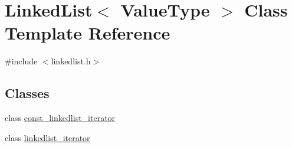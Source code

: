 \hypertarget{classLinkedList}{}\section{Linked\+List$<$ Value\+Type $>$ Class Template Reference}
\label{classLinkedList}


{\ttfamily \#include $<$linkedlist.\+h$>$}

\subsection*{Classes}
\begin{DoxyCompactItemize}
\item 
class \mbox{\hyperlink{classLinkedList_1_1const__linkedlist__iterator}{const\+\_\+linkedlist\+\_\+iterator}}
\item 
class \mbox{\hyperlink{classLinkedList_1_1linkedlist__iterator}{linkedlist\+\_\+iterator}}
\end{DoxyCompactItemize}

